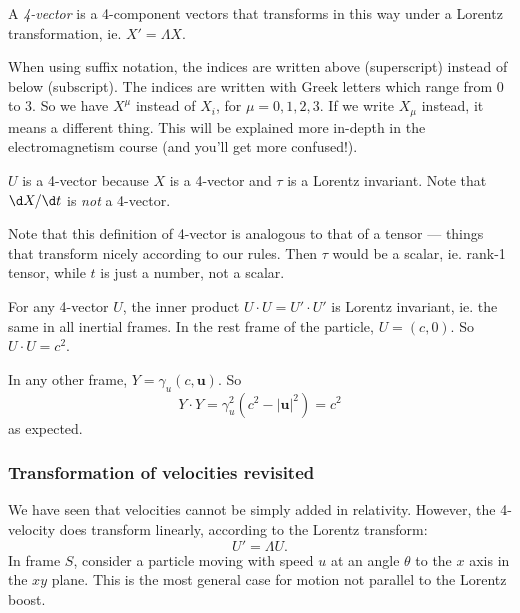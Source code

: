 \documentclass[a4paper]{article}
\begin{document}
\begin{defi}[4-vector]
  A \emph{4-vector} is a 4-component vectors that transforms in this way under a Lorentz transformation, ie. $X' = \Lambda X$.

  When using suffix notation, the indices are written above (superscript) instead of below (subscript). The indices are written with Greek letters which range from $0$ to $3$. So we have $X^\mu$ instead of $X_i$, for $\mu = 0, 1, 2, 3$. If we write $X_\mu$ instead, it means a different thing. This will be explained more in-depth in the electromagnetism course (and you'll get more confused!).
\end{defi}

$U$ is a 4-vector because $X$ is a 4-vector and $\tau$ is a Lorentz invariant. Note that $\d X/\d t$ is \emph{not} a 4-vector.

Note that this definition of 4-vector is analogous to that of a tensor --- things that transform nicely according to our rules. Then $\tau$ would be a scalar, ie. rank-1 tensor, while $t$ is just a number, not a scalar.

For any 4-vector $U$, the inner product $U\cdot U = U' \cdot U'$ is Lorentz invariant, ie. the same in all inertial frames. In the rest frame of the particle, $U = (c, 0)$. So $U\cdot U = c^2$.

In any other frame, $Y = \gamma_u(c, \mathbf{u})$. So
\[
  Y\cdot Y = \gamma_u^2 (c^2 - |\mathbf{u}|^2) = c^2
\]
as expected.

\subsubsection*{Transformation of velocities revisited}
We have seen that velocities cannot be simply added in relativity. However, the 4-velocity does transform linearly, according to the Lorentz transform:
\[
  U' = \Lambda U.
\]
In frame $S$, consider a particle moving with speed $u$ at an angle $\theta$ to the $x$ axis in the $xy$ plane. This is the most general case for motion not parallel to the Lorentz boost.
\end{document}
